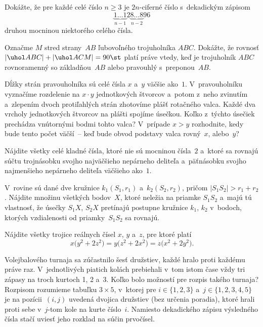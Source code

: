 {%
Dokážte, že pre každé celé číslo $n\ge3$ je $2n$-ciferné číslo
s~dekadickým zápisom
$$
\underbrace{1\dots1}_{n-1}2\underbrace{8\dots8}_{n-2}96
$$
druhou mocninou niektorého celého čísla.}

{%
Označme $M$ stred strany~$AB$ ľubovoľného trojuholníka $ABC$. Dokážte, že rovnosť
$|\uhol ABC|+|\uhol ACM|=90\st$ platí práve vtedy, keď je trojuholník $ABC$ rovnoramenný
so základňou~$AB$ alebo pravouhlý s~preponou~$AB$.}

{%
Dĺžky strán pravouholníka sú celé čísla $x$ a~$y$ väčšie ako~$1$.
V~pravouholníku vyznačíme rozdelenie na $x\cdot y$ jednotkových štvorcov
a~potom z~neho zvinutím a~zlepením dvoch protiľahlých strán
zhotovíme plášť rotačného valca.
Každé dva vrcholy jednotkových štvorcov na plášti spojíme úsečkou.
Koľko z~týchto úsečiek prechádza vnútornými bodmi tohto valca?
V~prípade $x>y$ rozhodnite, kedy bude tento počet väčší~--
keď bude obvod podstavy valca rovný~$x$, alebo~$y$?}

{%
Nájdite všetky celé kladné čísla, ktoré nie sú mocninou čísla~$2$
a~ktoré sa rovnajú súčtu trojnásobku svojho najväčšieho nepárneho
deliteľa a~päťnásobku svojho najmenšieho nepárneho deliteľa väčšieho
ako~$1$.}

{%
V~rovine sú dané dve kružnice $k_1(S_1,r_1)$ a~$k_2(S_2,r_2)$,
pričom $|S_1S_2|>r_1+r_2$. Nájdite množinu všetkých bodov~$X$, ktoré
neležia na priamke $S_1S_2$ a~majú tú vlastnosť, že úsečky $S_1X$,
$S_2X$ pretínajú postupne kružnice $k_1$, $k_2$ v~bodoch, ktorých
vzdialenosti od priamky~$S_1S_2$ sa rovnajú.
}

{%
Nájdite všetky trojice reálnych čísel $x$, $y$ a~$z$, pre ktoré
platí
$$
x\bigl(y^2+2z^2\bigr)=y\bigl(z^2+2x^2\bigr)=z\bigl(x^2+2y^2\bigr).
$$
}

{%
Volejbalového turnaja sa zúčastnilo šesť družstiev, každé hralo proti každému
práve raz. V~jednotlivých piatich kolách prebiehali
v~tom istom čase vždy tri zápasy na troch kurtoch 1, 2 a~3.
Koľko bolo možností pre rozpis takého turnaja?
Rozpisom rozumieme tabuľku $3\times5$, v~ktorej
pre $i\in\{1,2,3\}$ a~$j\in\{1,2,3,4,5\}$
je na pozícii~$(i,j)$ uvedená dvojica družstiev (bez určenia poradia), ktoré hrali
proti sebe v~$j$-tom kole na kurte číslo~$i$. Namiesto dekadického
zápisu výsledného čísla stačí uviesť jeho rozklad na súčin
prvočísel.}

